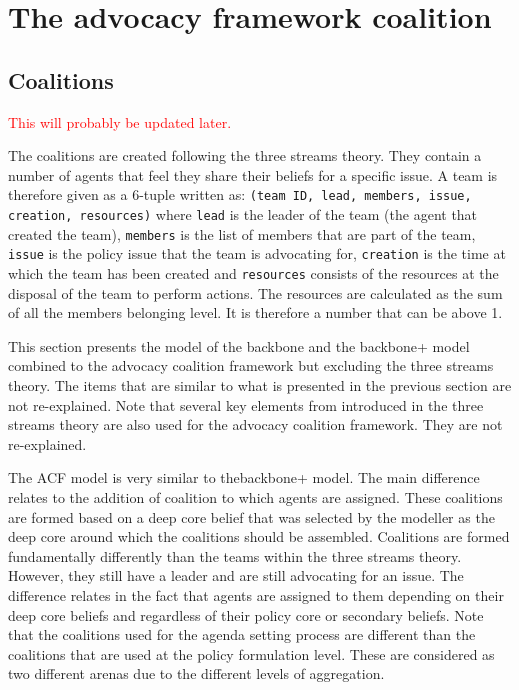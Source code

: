 \section{The advocacy framework coalition}


\subsection{Coalitions}


\textcolor{red}{This will probably be updated later.}


The coalitions are created following the three streams theory.  They contain a number of agents that feel they share their beliefs for a specific issue. A team is therefore given as a 6-tuple written as: \texttt{(team ID, lead, members, issue, creation, resources)} where \texttt{lead} is the leader of the team (the agent that created the team), \texttt{members} is the list of members that are part of the team, \texttt{issue} is the policy issue that the team is advocating for, \texttt{creation} is the time at which the team has been created and \texttt{resources} consists of the resources at the disposal of the team to perform actions. The resources are calculated as the sum of all the members belonging level. It is therefore a number that can be above 1.




This section presents the model of the backbone and the backbone+ model combined to the advocacy coalition framework but excluding the three streams theory. The items that are similar to what is presented in the previous section are not re-explained. Note that several key elements from introduced in the three streams theory are also used for the advocacy coalition framework. They are not re-explained.


The ACF model is very similar to thebackbone+ model. The main difference relates to the addition of coalition to which agents are assigned. These coalitions are formed based on a deep core belief that was selected by the modeller as the deep core around which the coalitions should be assembled. Coalitions are formed fundamentally differently than the teams within the three streams theory. However, they still have a leader and are still advocating for an issue. The difference relates in the fact that agents are assigned to them depending on their deep core beliefs and regardless of their policy core or secondary beliefs. Note that the coalitions used for the agenda setting process are different than the coalitions that are used at the policy formulation level. These are considered as two different arenas due to the different levels of aggregation.




